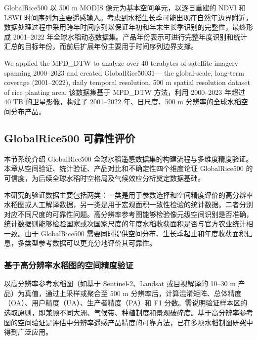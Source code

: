 GlobalRice500 以 500 m MODIS 像元为基本空间单元，以逐日重建的 NDVI 和 LSWI 时间序列为主要遥感输入。考虑到水稻生长季可能出现在自然年边界附近，数据处理过程中采用跨年时间序列以保证年初和年末生长季识别的完整性，最终形成 2001–2022 年全球水稻动态数据集。产品年份表示可进行完整年度识别和统计汇总的目标年份，而前后扩展年份主要用于时间序列边界支撑。


We applied the MPD_DTW to analyze over 40 terabytes of
satellite imagery spanning 2000–2023 and created GlobalRice50031—
the global-scale, long-term coverage (2001–2022), daily temporal
resolution, 500 m spatial resolution dataset of rice planting area.
该数据集基于 MPD\_DTW 方法，利用 2000--2023 年超过 40 TB 的卫星影像，构建了 2001--2022 年、日尺度、500 m 分辨率的全球水稻空间分布产品。 


\subsection{GlobalRice500 可靠性评价}
本节系统介绍 GlobalRice500 全球水稻遥感数据集的构建流程与多维度精度验证。本章从空间验证、统计验证、产品对比和不确定性四个维度论证 GlobalRice500 的可信度，为后续全球水稻时空格局及气候效应分析奠定数据基础。

本研究的验证数据主要包括两类：一类是用于参数选择和空间精度评价的高分辨率水稻图或人工解译数据，另一类是用于宏观面积一致性检验的统计数据。二者分别对应不同尺度的可靠性问题。高分辨率参考图能够检验像元级空间识别是否准确，统计数据则能够检验国家或次国家尺度的年度水稻收获面积是否与官方农业统计相一致。由于 GlobalRice500 需要同时提供空间分布、生长季起止和年度收获面积信息，多类型参考数据可以更充分地评价其可靠性。

\subsubsection{基于高分辨率水稻图的空间精度验证}

以高分辨率参考水稻图（如基于 Sentinel-2、Landsat 或目视解译的 10--30 m 产品）为真值，通过上采样或聚合至 500 m 分辨率后，计算混淆矩阵、总体精度（OA）、用户精度（UA）、生产者精度（PA）和 F1 分数\cite{Han2021,Zhang2017STOTEN}。需说明验证样本区的选取原则，即兼顾不同大洲、气候带、种植制度和景观破碎度。基于高分辨率参考图的空间验证是评估中分辨率遥感产品精度的可靠方法，已在多项水稻制图研究中得到广泛应用\cite{Dong2016}。

